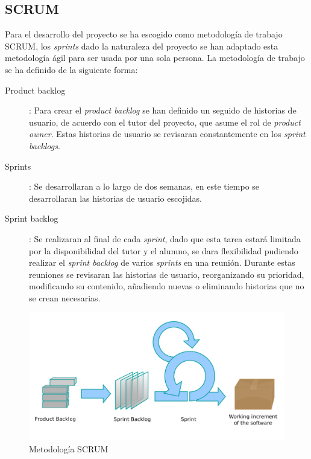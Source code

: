 \documentclass[12pt]{article} %
\begin{document}
\subsection{SCRUM}
Para el desarrollo del proyecto se ha escogido como metodología de trabajo SCRUM, los \textit{sprints} dado la naturaleza del proyecto se han adaptado esta metodología ágil para ser usada por una sola persona. La metodología de trabajo se ha definido de la siguiente forma:
\begin{description}
	\item[Product backlog]:
	\linebreak Para crear el \textit{product backlog} se han definido un seguido de historias de usuario, de acuerdo con el tutor del proyecto, que asume el rol de \textit{product owner}. Estas historias de usuario se revisaran constantemente en los \textit{sprint backlogs}.
	\item[Sprints]:
	\linebreak Se desarrollaran a lo largo de dos semanas, en este tiempo se desarrollaran las historias de usuario escojidas.
	\item[Sprint backlog]:
	\linebreak Se realizaran al final de cada \textit{sprint}, dado que esta tarea estará limitada por la disponibilidad del tutor y el alumno, se dara flexibilidad pudiendo realizar el \textit{sprint backlog} de varios \textit{sprints} en una reunión. Durante estas reuniones se revisaran las historias de usuario, reorganizando su prioridad, modificando su contenido, añadiendo nuevas o eliminando historias que no se crean necesarias.
\end{description}

\begin{figure}[ht!]
\center
\includegraphics[scale=0.2]{Scrum_process.png}
\caption{Metodología SCRUM}
\label{fig:scrum}
\end{figure}
\end{document}
